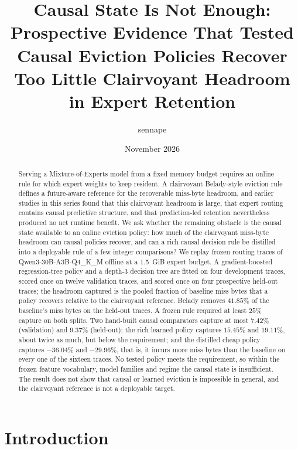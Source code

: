 \documentclass[11pt]{article}
\title{\textbf{Causal State Is Not Enough:\\
Prospective Evidence That Tested Causal Eviction Policies Recover\\
Too Little Clairvoyant Headroom in Expert Retention}}
\author{sennape}
\date{November 2026}
\theoremstyle{plain}
\theoremstyle{definition}
\begin{document}
\maketitle

\begin{abstract}
Serving a Mixture-of-Experts model from a fixed memory budget requires an online rule for which expert weights to keep resident. A clairvoyant Belady-style eviction rule defines a future-aware reference for the recoverable miss-byte headroom, and earlier studies in this series found that this clairvoyant headroom is large, that expert routing contains causal predictive structure, and that prediction-led retention nevertheless produced no net runtime benefit. We ask whether the remaining obstacle is the causal state available to an online eviction policy: how much of the clairvoyant miss-byte headroom can causal policies recover, and can a rich causal decision rule be distilled into a deployable rule of a few integer comparisons? We replay frozen routing traces of Qwen3-30B-A3B-Q4\_K\_M offline at a 1.5~GiB expert budget. A gradient-boosted regression-tree policy and a depth-3 decision tree are fitted on four development traces, scored once on twelve validation traces, and scored once on four prospective held-out traces; the headroom captured is the pooled fraction of baseline miss bytes that a policy recovers relative to the clairvoyant reference. Belady removes $41.85\%$ of the baseline's miss bytes on the held-out traces. A frozen rule required at least $25\%$ capture on both splits. Two hand-built causal comparators capture at most $7.42\%$ (validation) and $9.37\%$ (held-out); the rich learned policy captures $15.45\%$ and $19.11\%$, about twice as much, but below the requirement; and the distilled cheap policy captures $-36.04\%$ and $-29.96\%$, that is, it incurs more miss bytes than the baseline on every one of the sixteen traces. No tested policy meets the requirement, so within the frozen feature vocabulary, model families and regime the causal state is insufficient. The result does not show that causal or learned eviction is impossible in general, and the clairvoyant reference is not a deployable target.
\end{abstract}

\section{Introduction}
\label{sec:intro}
\end{document}
